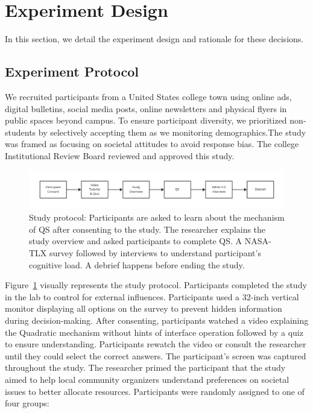 \section{Experiment Design}
\label{sec:experiment}
In this section, we detail the experiment design and rationale for these decisions.

\subsection{Experiment Protocol}
We recruited participants from a United States college town using online ads, digital bulletins, social media posts, online newsletters and physical flyers in public spaces beyond campus. To ensure participant diversity, we prioritized non-students by selectively accepting them as we monitoring demographics.The study was framed as focusing on societal attitudes to avoid response bias. The college Institutional Review Board reviewed and approved this study.

\begin{figure}[ht]
    \centering
    \includegraphics[width=1\textwidth]{content/image/study_flow.pdf}
    \caption{Study protocol: Participants are asked to learn about the mechanism of QS after consenting to the study. The researcher explains the study overview and asked participants to complete QS. A NASA-TLX survey followed by interviews to understand participant's cognitive load. A debrief happens before ending the study.}
    \label{fig:studyProtocol}
\end{figure}

Figure~\ref{fig:studyProtocol} visually represents the study protocol. Participants completed the study in the lab to control for external influences. Participants used a 32-inch vertical monitor displaying all options on the survey to prevent hidden information during decision-making. After consenting, participants watched a video explaining the Quadratic mechanism without hints of interface operation followed by a quiz to ensure understanding. Participants rewatch the video or consult the researcher until they could select the correct answers. The participant's screen was captured throughout the study. The researcher primed the participant that the study aimed to help local community organizers understand preferences on societal issues to better allocate resources. Participants were randomly assigned to one of four groups:

